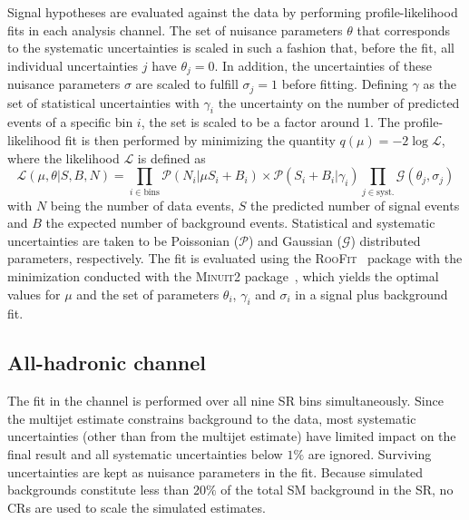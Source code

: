 Signal hypotheses are evaluated against the data by performing profile-likelihood fits in each analysis channel. 
The set of nuisance parameters $\theta$ that corresponds to the systematic uncertainties is scaled in such a fashion that, before the fit, all individual uncertainties $j$ have $\theta_j=0$. In addition, the uncertainties of these nuisance parameters $\sigma$ are scaled to fulfill $\sigma_j=1$ before fitting. Defining $\gamma$ as the set of statistical uncertainties with $\gamma_i$ the uncertainty on the number of predicted events of a specific bin $i$, the set is scaled to be a factor around 1. %
The profile-likelihood fit is then performed by minimizing the quantity $q(\mu)=-2\log\mathcal{L}$, where the likelihood $\mathcal{L}$ is defined as
\begin{equation}
\mathcal{L}(\mu,\theta|S,B,N)=\prod_{i\in\text{bins}}\mathcal{P}\left(N_i|\mu S_i+B_i\right)\times\mathcal{P}\left(S_i+B_i|\gamma_i\right)\prod_{j\in\text{syst.}}\mathcal{G}\left(\theta_j,\sigma_j\right)
\label{eq:likelihood}
\end{equation}
with $N$ being the number of data events, $S$ the predicted number of signal events and $B$ the expected number of background events.
Statistical and systematic uncertainties are taken to be Poissonian ($\mathcal{P}$) and Gaussian ($\mathcal{G}$) distributed parameters, respectively.
The fit is evaluated using the \textsc{RooFit}~\cite{RooFit} package with the minimization conducted with the \textsc{Minuit2} package~\cite{ref:1589282}, which yields the optimal values for $\mu$ and the set of parameters $\theta_i$, $\gamma_i$ and $\sigma_i$ in a signal plus background fit. %

\subsection{All-hadronic channel}
\label{sec:fit_allhad}

The fit in the \allhad channel is performed over all nine SR bins simultaneously. 
Since the multijet estimate constrains background to the data, most systematic uncertainties (other than from the multijet estimate) have limited impact on the final result and all systematic uncertainties below $1\%$ are ignored. Surviving uncertainties are kept as nuisance parameters in the fit. Because simulated backgrounds constitute less than $20\%$ of the total SM background in the SR, no CRs are used to scale the simulated estimates.

